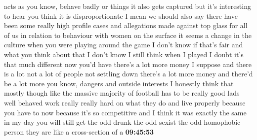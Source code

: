 \documentclass{article}%
\begin{document}
acts as you know, behave badly or things it also gets captured but it's interesting to hear you think it is disproportionate I mean we should also say there have been some really high profile cases and allegations made against top glass for all of us in relation to behaviour with women on the surface it seems a change in the culture when you were playing around the game I don't know if that's fair and what you think about that I don't know I still think when I played I doubt it's that much different now you'd have there's a lot more money I suppose and there is a lot not a lot of people not settling down there's a lot more money and there'd be a lot more you know, dangers and outside interests I honestly think that mostly though like the massive majority of football has to be really good lads well behaved work really really hard on what they do and live properly because you have to now because it's so competitive and I think it was exactly the same in my day you will still get the odd drunk the odd sexist the odd homophobic person they are like a cross{-}section of a%
\textbf{09:45:53}%
\newline%
\end{document}
